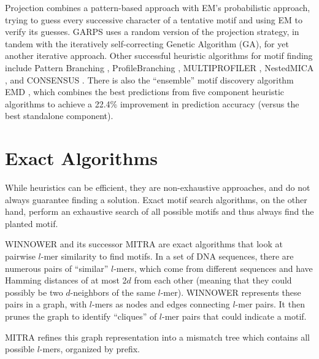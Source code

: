 \documentclass[oneside,12pt]{DISCSthesis}
\begin{document}
		Projection \cite{blanchette2002discovery} combines a pattern-based approach with EM's probabilistic approach, trying to guess every successive character of a tentative motif and using EM to verify its guesses. GARPS \cite{huo2009combining} uses a random version of the projection strategy, in tandem with the iteratively self-correcting Genetic Algorithm (GA), for yet another iterative approach. Other successful heuristic algorithms for motif finding include Pattern Branching \cite{price2003finding}, ProfileBranching \cite{price2003finding}, MULTIPROFILER \cite{keich2002finding}, NestedMICA \cite{down2005nestedmica}, and CONSENSUS \cite{hertz1999identifying}. There is also the ``ensemble'' motif discovery algorithm EMD \cite{hu2006emd}, which combines the best predictions from five component heuristic algorithms to achieve a 22.4\% improvement in prediction accuracy (versus the best standalone component).

	\section{Exact Algorithms}
		While heuristics can be efficient, they are non-exhaustive approaches, and do not always guarantee finding a solution. Exact motif search algorithms, on the other hand, perform an exhaustive search of all possible motifs and thus always find the planted motif.

		WINNOWER \cite{pevzner2000combinatorial} and its successor MITRA \cite{eskin2002finding} are exact algorithms that look at pairwise $l$-mer similarity to find motifs. In a set of DNA sequences, there are numerous pairs of ``similar'' $l$-mers, which come from different sequences and have Hamming distances of at most 2$d$ from each other (meaning that they could possibly be two $d$-neighbors of the same $l$-mer). WINNOWER represents these pairs in a graph, with $l$-mers as nodes and edges connecting $l$-mer pairs. It then prunes the graph to identify ``cliques'' of $l$-mer pairs that could indicate a motif.

		\noindent MITRA refines this graph representation into a mismatch tree which contains all possible $l$-mers, organized by prefix.
\end{document}

